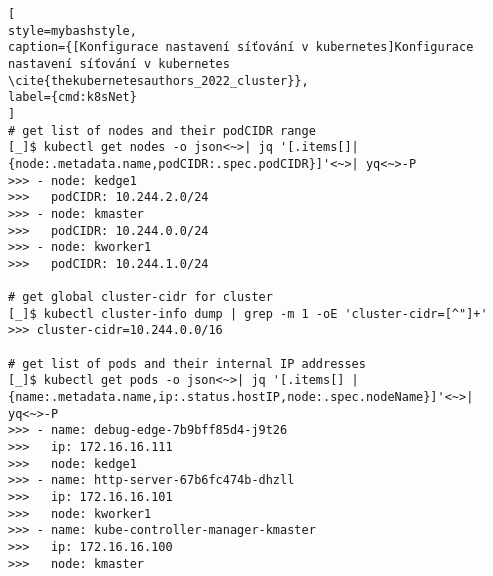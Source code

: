 \begin{lstfloat}
\begin{lstlisting}[
style=mybashstyle,
caption={[Konfigurace nastavení síťování v kubernetes]Konfigurace nastavení síťování v kubernetes \cite{thekubernetesauthors_2022_cluster}},
label={cmd:k8sNet}
]
# get list of nodes and their podCIDR range
[_]$ kubectl get nodes -o json<~>| jq '[.items[]|{node:.metadata.name,podCIDR:.spec.podCIDR}]'<~>| yq<~>-P
>>> - node: kedge1
>>>   podCIDR: 10.244.2.0/24
>>> - node: kmaster
>>>   podCIDR: 10.244.0.0/24
>>> - node: kworker1
>>>   podCIDR: 10.244.1.0/24

# get global cluster-cidr for cluster
[_]$ kubectl cluster-info dump | grep -m 1 -oE 'cluster-cidr=[^"]+'
>>> cluster-cidr=10.244.0.0/16

# get list of pods and their internal IP addresses  
[_]$ kubectl get pods -o json<~>| jq '[.items[] | {name:.metadata.name,ip:.status.hostIP,node:.spec.nodeName}]'<~>| yq<~>-P
>>> - name: debug-edge-7b9bff85d4-j9t26
>>>   ip: 172.16.16.111
>>>   node: kedge1
>>> - name: http-server-67b6fc474b-dhzll
>>>   ip: 172.16.16.101
>>>   node: kworker1
>>> - name: kube-controller-manager-kmaster
>>>   ip: 172.16.16.100
>>>   node: kmaster
\end{lstlisting}
\end{lstfloat}
